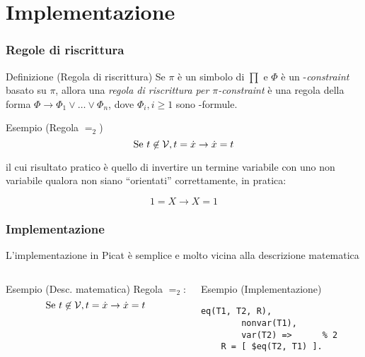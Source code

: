\documentclass{beamer}
\begin{document}
\section{Implementazione}

\begin{frame}
  \frametitle{Regole di riscrittura}
  \begin{block}{Definizione (Regola di riscrittura)}
    Se $\pi$ è un simbolo di $\prod$ e $\Phi$ è un \lset{}-\textit{constraint} basato su $\pi$, allora una \emph{regola di riscrittura per $\pi$-constraint} è una regola della forma $\Phi \to \Phi_1 \lor \ldots \lor \Phi_n$, dove $\Phi_i, i \geq 1$ sono \lset{}-formule.
  \end{block}
  \begin{exampleblock}{Esempio (Regola $=_2$)}
  	\[ \text{Se }t \not\in \mathcal{V}, t = \dot{x} \to \dot{x} = t \]
  	
  	il cui risultato pratico è quello di invertire un termine variabile con uno non variabile qualora non siano ``orientati'' correttamente, in pratica:
  	
    \[ 1 = X \to X = 1 \]
  \end{exampleblock}
\end{frame}


\begin{frame}[fragile]
  \frametitle{Implementazione}
  L'implementazione in Picat è semplice e molto vicina alla descrizione matematica
  \begin{columns}[c]
  	\begin{exampleblock}{Esempio (Desc. matematica)}
  	  Regola $=_2$:
  	  \[
  	    \text{Se }t \not\in \mathcal{V}, t = \dot{x} \to \dot{x} = t 
  	  \]
  	\end{exampleblock}
  
  	\begin{exampleblock}{Esempio (Implementazione)}
\begin{verbatim}
eq(T1, T2, R), 
        nonvar(T1),
        var(T2) =>      % 2
    R = [ $eq(T2, T1) ].
\end{verbatim}
  	\end{exampleblock}
  \end{columns}
\end{frame}

\end{document}
